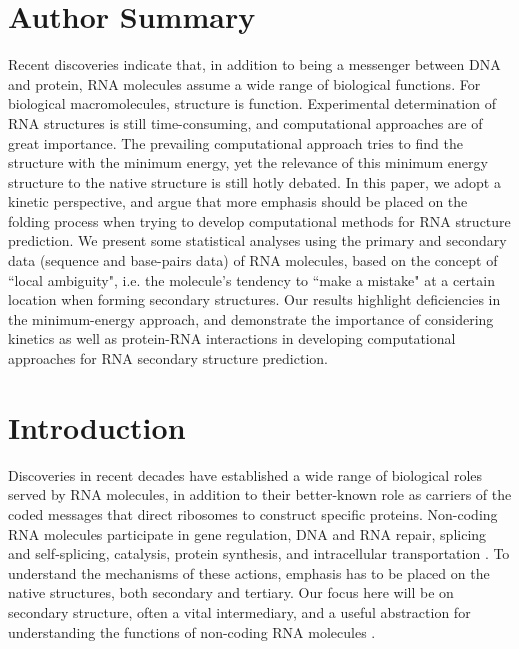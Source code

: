 \documentclass[10pt,letterpaper]{article}
\begin{document}
%
%

\linenumbers

\section*{Author Summary}
Recent discoveries indicate that, in addition to being a messenger between DNA and protein, RNA molecules assume a wide range of biological functions. For biological macromolecules, structure is function. Experimental determination of RNA structures is still time-consuming, and computational approaches are of great importance. The prevailing computational approach tries to find the structure with the minimum energy, yet the relevance of this minimum energy structure to the native structure is still hotly debated. In this paper, we adopt a kinetic perspective, and argue that more emphasis should be placed on the folding process when trying to develop computational methods for RNA structure prediction. We present some statistical analyses using the primary and secondary data (sequence and base-pairs data) of RNA molecules, based on the concept of ``local ambiguity", i.e. the molecule's tendency to ``make a mistake" at a certain location when forming secondary structures. Our results highlight deficiencies in the minimum-energy approach, and demonstrate the importance of considering kinetics as well as protein-RNA interactions in developing computational approaches for RNA secondary structure prediction.

\linenumbers

\section*{Introduction}

Discoveries in recent decades have established a wide range of biological roles served by RNA molecules, in addition to their better-known role as carriers of the coded messages that direct ribosomes to construct specific proteins. Non-coding RNA molecules participate in gene regulation, DNA and RNA repair, splicing and self-splicing, catalysis, protein synthesis, and intracellular transportation \cite{Morris2014-iu,Kung2013-se}. To understand the mechanisms of these actions, emphasis has to be placed on the native structures, both secondary and tertiary. Our focus here will be on secondary structure, often a vital intermediary, and a useful abstraction for understanding the functions of non-coding RNA molecules \cite{Higgs2000-gj}.
\end{document}
